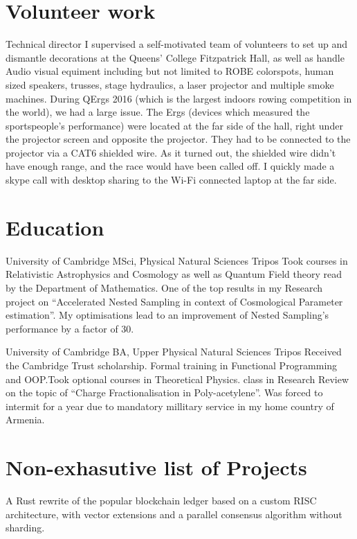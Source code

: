 \documentclass{CurriculumVitae}[10pt, condensed]
\begin{document}
{  \section*{Volunteer work} 
  {Technical director} {I supervised a self-motivated team of
    volunteers to set up and dismantle decorations at the Queens'
    College Fitzpatrick Hall, as well as handle Audio visual equiment
    including but not limited to ROBE colorspots, human sized
    speakers, trusses, stage hydraulics, a laser projector and
    multiple smoke machines.  During QErgs 2016 (which is the largest
    indoors rowing competition in the world), we had a large
    issue. The Ergs (devices which measured the sportspeople's
    performance) were located at the far side of the hall, right under
    the projector screen and opposite the projector. They had to be
    connected to the projector via a CAT6 shielded wire. As it turned
    out, the shielded wire didn't have enough range, and the race
    would have been called off.  I quickly made a skype call with
    desktop sharing to the Wi-Fi connected laptop at the far side. }
  \section*{Education}%

   {University of Cambridge} {MSci, }
  {Physical Natural Sciences Tripos} {Took courses in Relativistic
    Astrophysics and Cosmology as well as Quantum Field theory read by
    the Department of Mathematics. One of the top results in my
    Research project on ``Accelerated Nested Sampling in context of
    Cosmological Parameter estimation''. My optimisations lead to an
    improvement of Nested Sampling's performance by a factor of 30. }

  {University of Cambridge} {BA, Upper }{Physical Natural Sciences
    Tripos} {Received the Cambridge Trust scholarship. Formal training
    in Functional Programming and OOP.\@ Took optional courses in
    Theoretical Physics.  class in Research Review on the topic
    of ``Charge Fractionalisation in Poly-acetylene''. Was forced to
    intermit for a year due to mandatory millitary service in my home
    country of Armenia. }

  \section*{Non-exhasutive list of Projects}%
  {A Rust rewrite of the popular blockchain ledger based on a custom
    RISC architecture, with vector extensions and a parallel consensus
    algorithm without sharding.
  }

}
\end{document}
